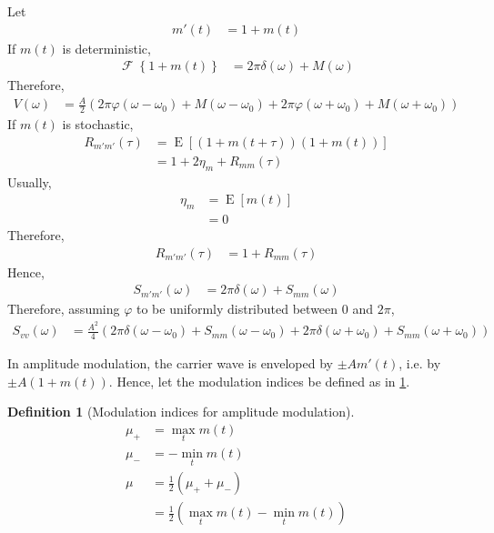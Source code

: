 \documentclass[titlepage, fleqn, a4paper, 12pt, twoside]{article}
\theoremstyle{definition}
\newtheorem{definition}{Definition}
\theoremstyle{theorem}
\DeclareMathOperator{\expct}{\mathrm{E}}
\DeclareMathOperator{\FT}{\mathcal{F}}
\begin{document}
Let
\begin{align*}
	m'(t) &= 1 + m(t)
\end{align*}
If $m(t)$ is deterministic,
\begin{align*}
	\FT\left\{ 1 + m(t) \right\} &= 2 \pi \delta(\omega) + M(\omega)
\end{align*}
Therefore,
\begin{align*}
	V(\omega) &= \frac{A}{2} \left( 2 \pi \varphi(\omega - \omega_0) + M(\omega - \omega_0) + 2 \pi \varphi(\omega + \omega_0) + M(\omega + \omega_0) \right)
\end{align*}
If $m(t)$ is stochastic,
\begin{align*}
	R_{m' m'}(\tau) &= \expct\left[ \left( 1 + m(t + \tau) \right) \left( 1 + m(t) \right) \right]\\
	&= 1 + 2 \eta_m + R_{m m}(\tau)
\end{align*}
Usually,
\begin{align*}
	\eta_m &= \expct\left[ m(t) \right]\\
	&= 0
\end{align*}
Therefore,
\begin{align*}
	R_{m' m'}(\tau) &= 1 + R_{m m}(\tau)
\end{align*}
Hence,
\begin{align*}
	S_{m' m'}(\omega) &= 2 \pi \delta(\omega) + S_{m m}(\omega)
\end{align*}
Therefore, assuming $\varphi$ to be uniformly distributed between $0$ and $2 \pi$,
\begin{align*}
	S_{v v}(\omega) &= \frac{A^2}{4} \left( 2 \pi \delta(\omega - \omega_0) + S_{m m}(\omega - \omega_0) + 2 \pi \delta (\omega + \omega_0) + S_{m m}(\omega + \omega_0) \right)
\end{align*}

In amplitude modulation, the carrier wave is enveloped by $\pm A m'(t)$, i.e. by $\pm A \left( 1 + m(t) \right)$.
Hence, let the modulation indices be defined as in \cref{def:modulation_indices_for_AM}.

\begin{definition}[Modulation indices for amplitude modulation]
	\begin{align*}
		\mu_+ &= \max_{t} m(t)\\
		\mu_- &= -\min_{t} m(t)\\
		\mu &= \frac{1}{2} \left( \mu_+ + \mu_- \right)\\
		&= \frac{1}{2} \left( \max_{t} m(t) - \min_{t} m(t) \right)
	\end{align*}
	\label{def:modulation_indices_for_AM}
\end{definition}
\end{document}
